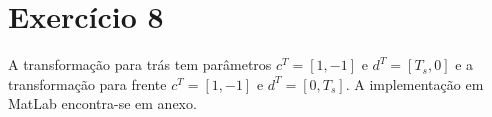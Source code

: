 \section*{Exercício 8}
\label{ex:9}


    A transformação para trás tem parâmetros $c^T = [1, -1]$ e $d^T = [T_s, 0]$ e a transformação para frente $c^T = [1, -1]$ e $d^T = [0, T_s]$. A implementação em MatLab encontra-se em anexo.